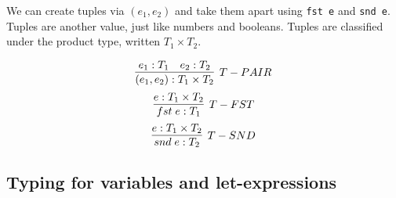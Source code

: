 \documentclass[11pt]{article}
\begin{document}
We can create tuples via $(e_1, e_2)$ and take them apart using \verb~fst e~ and \verb~snd e~. Tuples are another value, just like numbers and booleans. Tuples are classified under the product type, written $T_1 \times T_2$. 

\[
    \infer[T-PAIR]{(e_1, e_2) : T_1 \times T_2}{
        e_1 : T_1
        &
        e_2 : T_2
     }
\]
\[
    \infer[T-FST]{fst \; e : T_1}{
        e : T_1 \times T_2
    }
\]
\[
    \infer[T-SND]{snd \; e : T_2}{
        e: T_1 \times T_2
    }
\]

\subsection{Typing for variables and let-expressions}

\end{document}
